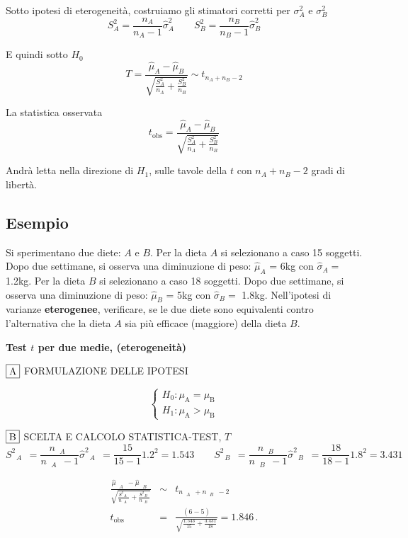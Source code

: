 \documentclass[
  11pt,
]{book}
\theoremstyle{mytheoremstyle}
\theoremstyle{mydefstyle}
\begin{document}
Sotto ipotesi di eterogeneità, costruiamo gli stimatori corretti per \(\sigma^2_A\) e \(\sigma^2_B\)
\[S^2_A=\frac{n_A}{n_A-1}\hat\sigma_A^2\qquad S^2_B=\frac{n_B}{n_B-1}\hat\sigma_B^2\]

E quindi sotto \(H_0\)
\[T=\frac{\hat\mu_A-\hat\mu_B}{\sqrt{\frac{S_A^2}{n_A}+\frac{S_B^2}{n_B}}}\sim t_{n_A+n_B-2}\]

La statistica osservata
\[t_{\text{obs}}=\frac{\hat\mu_A-\hat\mu_B}{\sqrt{\frac{S_A^2}{n_A}+\frac{S_B^2}{n_B}}}\]

Andrà letta nella direzione di \(H_1\), sulle tavole della \(t\) con \(n_A+n_B-2\) gradi di libertà.

\subsection{Esempio}\label{esempio-3}

Si sperimentano due diete: \(A\) e \(B\). Per la dieta \(A\) si
selezionano a caso 15 soggetti. Dopo due settimane, si osserva una diminuzione di peso: \(\hat\mu_A\) = 6kg con
\(\hat\sigma_A=\) 1.2kg. Per la dieta \(B\) si selezionano a caso 18
soggetti. Dopo due settimane, si osserva una diminuzione di peso:
\(\hat\mu_B\) = 5kg con \(\hat\sigma_B=\) 1.8kg. Nell'ipotesi
di varianze \textbf{eterogenee}, verificare, se le due diete
sono equivalenti contro l'alternativa che la dieta \(A\) sia più efficace
(maggiore) della dieta \(B\).

\textbf{Test \(t\) per due medie, (eterogeneità)}

\(\fbox{A}\) FORMULAZIONE DELLE IPOTESI

\[\begin{cases}
   H_0: \mu_\text{A} = \mu_\text{B} \\
   H_1: \mu_\text{A} > \mu_\text{B} 
   \end{cases}\]

\(\fbox{B}\) SCELTA E CALCOLO STATISTICA-TEST, \(T\)
\[
     S^2_\text{ $A$ }=\frac{n_\text{ $A$ }}{n_\text{ $A$ }-1}\hat\sigma^2_\text{ $A$ }=\frac{ 15 }{ 15 -1} 1.2 ^2= 1.543  \qquad
     S^2_\text{ $B$ }=\frac{n_\text{ $B$ }}{n_\text{ $B$ }-1}\hat\sigma^2_\text{ $B$ }=\frac{ 18 }{ 18 -1} 1.8 ^2= 3.431 
   \]

\begin{eqnarray*}
   \frac{\hat\mu_\text{ $A$ } - \hat\mu_\text{ $B$ }}
   {\sqrt{\frac {S^2_\text{ $A$ }}{n_\text{ $A$ }}+\frac {S^2_\text{ $B$ }}{n_\text{ $B$ }}}}&\sim&t_{n_\text{ $A$ }+n_\text{ $B$ }-2}\\
   t_{\text{obs}}
   &=& \frac{ ( 6 -  5 )} {\sqrt{\frac{ 1.543 }{ 15 }+\frac{ 3.431 }{ 18 }}}
   =   1.846 \, .
   \end{eqnarray*}
\end{document}
